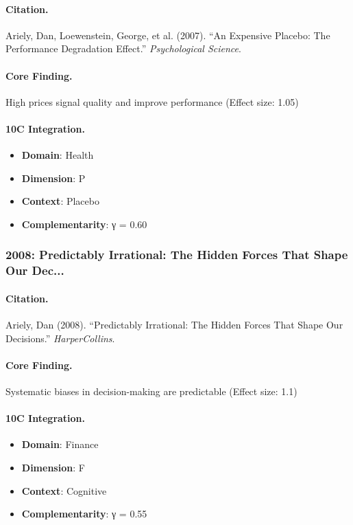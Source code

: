 \paragraph{Citation.}
Ariely, Dan, Loewenstein, George, et al. (2007). ``An Expensive Placebo: The Performance Degradation Effect.''
\textit{Psychological Science}.

\paragraph{Core Finding.}
High prices signal quality and improve performance (Effect size: 1.05)

\paragraph{10C Integration.}
\begin{itemize}[nosep]
  \item \textbf{Domain}: Health
  \item \textbf{Dimension}: P
  \item \textbf{Context}: Placebo
  \item \textbf{Complementarity}: γ = 0.60
\end{itemize}

\subsubsection{2008: Predictably Irrational: The Hidden Forces That Shape Our Dec...}

\paragraph{Citation.}
Ariely, Dan (2008). ``Predictably Irrational: The Hidden Forces That Shape Our Decisions.''
\textit{HarperCollins}.

\paragraph{Core Finding.}
Systematic biases in decision-making are predictable (Effect size: 1.1)

\paragraph{10C Integration.}
\begin{itemize}[nosep]
  \item \textbf{Domain}: Finance
  \item \textbf{Dimension}: F
  \item \textbf{Context}: Cognitive
  \item \textbf{Complementarity}: γ = 0.55
\end{itemize}

